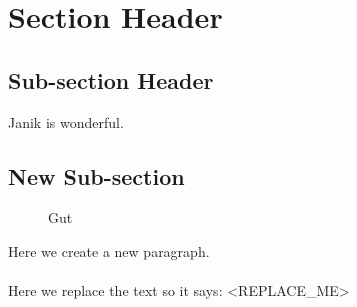 \section{Section Header}

\subsection{Sub-section Header}

Janik is wonderful.

\subsection{New Sub-section}

\begin{figure}[ht!]
\centering
{}
\caption{Gut}
\end{figure}
\noindent
Here we create a new paragraph. \\ \\
Here we replace the text so it says: <REPLACE_ME>